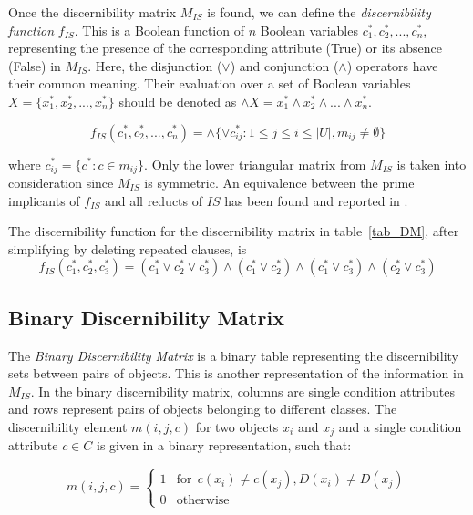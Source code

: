 \documentclass[citenumber]{llncs}
\begin{document}
  Once the discernibility matrix $M_{IS}$ is found, we can define the \textit{discernibility function} $f_{IS}$.
  This is a Boolean function of $n$ Boolean variables $c_1^*, c_2^*,...,c_n^*$, representing the presence of
  the corresponding attribute (True) or its absence (False) in $M_{IS}$. Here, the disjunction ($\vee$) and 
  conjunction ($\wedge$) operators have their common meaning. Their evaluation over a set of Boolean variables
  $X=\lbrace x_1^*, x_2^*, ..., x_n^* \rbrace$ should be denoted as 
  $\wedge X= x_1^* \wedge x_2^* \wedge ... \wedge x_n^* $.

  \begin{equation}
  	f_{IS}(c_1^*, c_2^*,...,c_n^*)=\wedge \lbrace \vee c_{ij}^* : 1 \leq j \leq i \leq |U|, 
  									m_{ij} \neq \emptyset \rbrace
  \end{equation}

  where $c_{ij}^*=\lbrace c^* : c \in m_{ij} \rbrace$. Only the lower triangular matrix from $M_{IS}$ is
  taken into consideration since $M_{IS}$ is symmetric. An equivalence between the prime implicants of
  $f_{IS}$ and all reducts of $IS$ has been found and reported in \cite{Pawlak07}.
  
  The discernibility function for the discernibility matrix in table~\ref{tab_DM}, after simplifying by 
  deleting repeated clauses, is  
  $$f_{IS}(c_1^*,c_2^*,c_3^*)=(c_1^* \vee c_2^* \vee c_3^*) \wedge (c_1^* \vee c_2^*) 
   \wedge (c_1^* \vee c_3^*) \wedge (c_2^* \vee c_3^*) $$
  
  
\subsection{Binary Discernibility Matrix}
  The \textit{Binary Discernibility Matrix} is a binary table representing the discernibility sets between pairs 
  of objects. This is another representation of the information in $M_{IS}$. In the binary discernibility
  matrix, columns are single condition attributes and rows represent pairs of objects belonging to different 
  classes. The discernibility element $m(i, j, c)$ for two objects $x_i$ and $x_j$ and a single condition 
  attribute $c \in C$ is given in a binary representation, such that:
  
  \begin{equation}
  	m(i, j, c)=\left\lbrace\begin{array}{cl}
  			1 & \mathrm{for~~}c(x_i) \neq c(x_j),D(x_i) \neq D(x_j)\\
  			0 								   & \mathrm{otherwise} 
  	\end{array}\right.
  \end{equation} 
  
\end{document}
